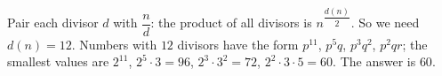 Pair each divisor $d$ with $\dfrac {n}{d}$: the product of all divisors is $n^{\dfrac{d(n)}{2}}$. So we need $d(n)=12$. Numbers with $12$ divisors have the form $p^{11}$, $p^5q$, $p^3q^2$, $p^2qr$; the smallest values are $2^{11}$, $2^5\cdot3=96$, $2^3\cdot3^2=72$, $2^2\cdot3\cdot5=60$. The answer is $\boxed{60}$.
